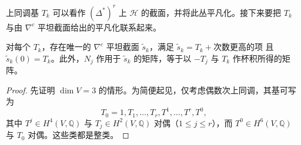 上同调基 $T_k$ 可以看作 $(\Delta^*)^r$ 上 $\mathcal H$ 的截面，并将此丛平凡化。接下来要把 $T_k$ 与由 $\nabla^c$ 平坦截面给出的平凡化联系起来。
\begin{proposition}\label{prop:a-model-canonical-flat-basis}
对每个 $T_k$，存在唯一的 $\nabla^c$ 平坦截面 $\widetilde s_k$，满足 $\widetilde s_k=T_k+\text{次数更高的项}$ 且 $\widetilde s_k(0)=T_k$。此外，$N_j$ 作用于 $\widetilde s_k$ 的矩阵，等于以 $-T_j$ 与 $T_k$ 作杯积所得的矩阵。
\end{proposition}
\begin{proof}
先证明 $\dim V=3$ 的情形。为简便起见，仅考虑偶数次上同调，其基可写为
\[
T_0=1,T_1,\ldots,T_r,T^1,\ldots,T^r,T^0,
\]
其中 $T^j\in H^4(V,\mathbb Q)$ 与 $T_j\in H^2(V,\mathbb Q)$ 对偶（$1\le j\le r$），而 $T^0\in H^6(V,\mathbb Q)$ 与 $T_0$ 对偶。这些类都是整类。


\end{proof}
